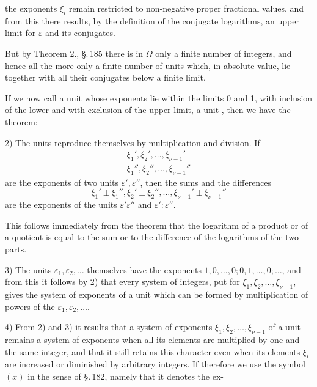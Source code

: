 the exponents $\xi_i$ remain restricted to non-negative proper fractional values, and from this there results, by the definition of the conjugate logarithms, an upper limit for $\varepsilon$ and its conjugates.

But by Theorem 2., \S.\,185 there is in $\Omega$ only a finite number of integers, and hence all the more only a finite number of units which, in absolute value, lie together with all their conjugates below a finite limit.

If we now call a unit whose exponents lie within the limits 0 and 1, with inclusion of the lower and with exclusion of the upper limit, a unit , then we have the theorem:


2) The units reproduce themselves by multiplication and division. If
\[
\begin{array}{l}
\xi_1', \xi_2', \ldots, \xi_{\nu-1}' \\
\xi_1'', \xi_2'', \ldots, \xi_{\nu-1}''
\end{array}
\]
are the exponents of two units $\varepsilon', \varepsilon''$, then the sums and the differences
\[
\xi_1' \pm \xi_1'', \xi_2' \pm \xi_2'', \ldots, \xi_{\nu-1}' \pm \xi_{\nu-1}''
\]
are the exponents of the units $\varepsilon' \varepsilon''$ and $\varepsilon' : \varepsilon''$.

This follows immediately from the theorem that the logarithm of a product or of a quotient is equal to the sum or to the difference of the logarithms of the two parts.

3) The units $\varepsilon_1, \varepsilon_2, \ldots$ themselves have the exponents $1, 0, \ldots, 0; 0, 1, \ldots, 0; \ldots$, and from this it follows by 2) that every system of integers, put for $\xi_1, \xi_2, \ldots, \xi_{\nu-1}$, gives the system of exponents of a unit which can be formed by multiplication of powers of the $\varepsilon_1, \varepsilon_2, \ldots$.

4) From 2) and 3) it results that a system of exponents $\xi_1, \xi_2, \ldots, \xi_{\nu-1}$ of a unit remains a system of exponents when all its elements are multiplied by one and the same integer, and that it still retains this character even when its elements $\xi_i$ are increased or diminished by arbitrary integers. If therefore we use the symbol $(x)$ in the sense of \S.\,182, namely that it denotes the ex-
